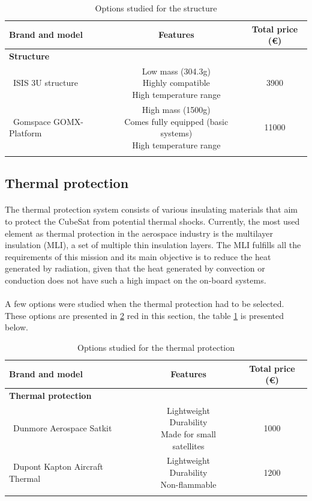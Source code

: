 \begin{longtable}{| l | c | c | }
\hline
\rowcolor[gray]{0.80}	\textbf{Brand and model} &  \textbf{Features}     & \textbf{Total price (\euro)}   \\
\hline
\endfirsthead

\rowcolor[gray]{0.85} \textbf{Structure} &  &  \\
	   ~ISIS 3U structure & \makecell{Low mass (304.3g) \\ Highly compatible \\ High temperature range} & 3900 \\
	   \hline
	   ~Gomspace GOMX-Platform & \makecell{High mass (1500g) \\ Comes fully equipped (basic systems) \\ High temperature range} & 11000 \\
	   \hline
\caption{Options studied for the structure}
\label{structureoptions}
\end{longtable}

\subsection{Thermal protection}
\paragraph{}The thermal protection system consists of various insulating materials that aim to protect the CubeSat from potential thermal shocks. Currently, the most used element as thermal protection in the aerospace industry is the multilayer insulation (MLI), a set of multiple thin insulation layers. The MLI fulfills all the requirements of this mission and its main objective is to reduce the heat generated by radiation, given that the heat generated by convection or conduction does not have such a high impact on the on-board systems.

\paragraph{}A few options were studied when the thermal protection had to be selected. These options are presented in \ref{thermaloptions}
red in this section, the table \ref{structureoptions} is presented below.

\begin{longtable}{| l | c | c | }
\hline
\rowcolor[gray]{0.80}	\textbf{Brand and model} &  \textbf{Features}     & \textbf{Total price (\euro)}   \\
\hline
\endfirsthead
\rowcolor[gray]{0.85} \textbf{Thermal protection} &  &  \\
	   ~Dunmore Aerospace Satkit & \makecell{Lightweight \\ Durability \\ Made for small satellites}& 1000 \\
	   \hline
	   ~Dupont Kapton Aircraft Thermal & \makecell{Lightweight \\ Durability \\ Non-flammable} & 1200 \\
	\hline

\caption{Options studied for the thermal protection}
\label{thermaloptions}
\end{longtable}

